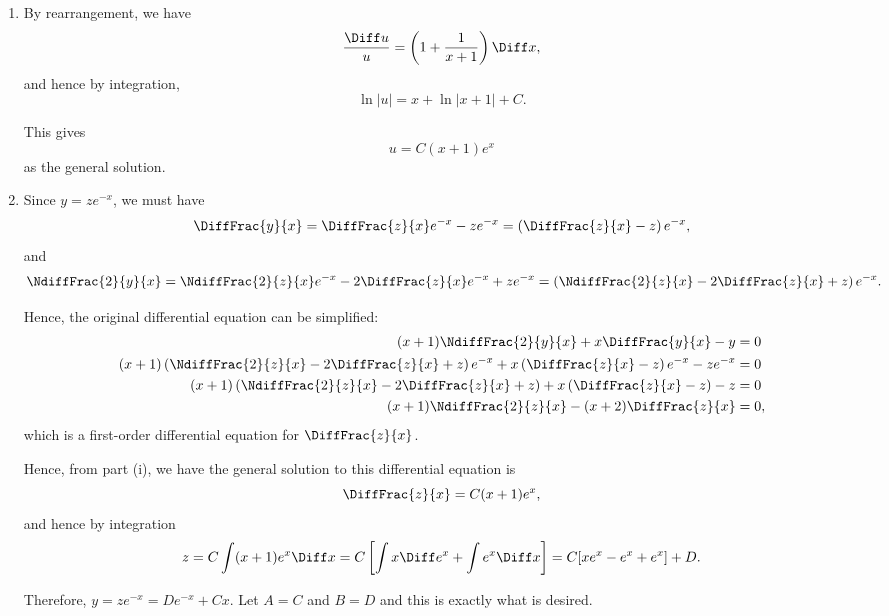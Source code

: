 \Question{\currfilebase}

\begin{enumerate}
    \item By rearrangement, we have
          \[
              \frac{\Diff u}{u} = \left(1 + \frac{1}{x + 1}\right) \Diff x,
          \]
          and hence by integration,
          \[
              \ln |u| = x + \ln|x + 1| + C.
          \]

          This gives
          \[
              u = C (x + 1) e^x
          \]
          as the general solution.

    \item Since \(y = z e^{-x}\), we must have
          \[
              \DiffFrac{y}{x} = \DiffFrac{z}{x} e^{-x} - z e^{-x} = \left(\DiffFrac{z}{x} - z\right) e^{-x},
          \]
          and
          \[
              \NdiffFrac{2}{y}{x} = \NdiffFrac{2}{z}{x} e^{-x} - 2 \DiffFrac{z}{x} e^{-x} + z e^{-x} = \left(\NdiffFrac{2}{z}{x} - 2 \DiffFrac{z}{x} + z\right) e^{-x}.
          \]

          Hence, the original differential equation can be simplified:
          \begin{align*}
              (x + 1) \NdiffFrac{2}{y}{x} + x \DiffFrac{y}{x} - y                                                                            & = 0  \\
              (x + 1) \left(\NdiffFrac{2}{z}{x} - 2 \DiffFrac{z}{x} + z\right) e^{-x} + x \left(\DiffFrac{z}{x} - z\right) e^{-x} - z e^{-x} & = 0  \\
              (x + 1) \left(\NdiffFrac{2}{z}{x} - 2 \DiffFrac{z}{x} + z\right) + x \left(\DiffFrac{z}{x} - z\right) - z                      & = 0  \\
              (x + 1) \NdiffFrac{2}{z}{x} - (x + 2)\DiffFrac{z}{x}                                                                           & = 0,
          \end{align*}
          which is a first-order differential equation for \(\DiffFrac{z}{x}\).

          Hence, from part (i), we have the general solution to this differential equation is
          \[
              \DiffFrac{z}{x} = C(x + 1)e^x,
          \]
          and hence by integration
          \[
              z = C \int (x + 1) e^x \Diff x = C \left[\int x \Diff e^x + \int e^x \Diff x\right] = C [xe^x - e^x + e^x] + D.
          \]

          Therefore, \(y = z e^{-x} = De^{-x} + Cx\). Let \(A = C\) and \(B = D\) and this is exactly what is desired.


\end{enumerate}
